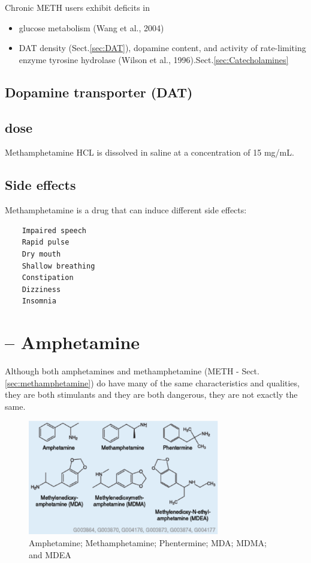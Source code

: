 Chronic METH users exhibit deficits in 
\begin{itemize}
  \item  glucose metabolism (Wang et al., 2004)
  
  \item DAT density (Sect.\ref{sec:DAT}), dopamine content, and activity of
  rate-limiting enzyme tyrosine hydrolase (Wilson et al., 1996).Sect.\ref{sec:Catecholamines}
\end{itemize}

\subsection{Dopamine transporter (DAT)}
\label{sec:dopamine-transporter}
\label{sec:DAT}




\subsection{dose}

Methamphetamine HCL is dissolved in saline at a concentration of 15 mg/mL.

\subsection{Side effects}

Methamphetamine is a drug that can induce different side effects:
\begin{verbatim}
    Impaired speech
    Rapid pulse
    Dry mouth
    Shallow breathing
    Constipation
    Dizziness
    Insomnia
\end{verbatim}

\section{-- Amphetamine}
\label{chap:amphetamine}
\label{sec:amphetamine}

Although both amphetamines and methamphetamine (METH -
Sect.\ref{sec:methamphetamine}) do have many of the same characteristics and
qualities, they are both stimulants and they are both dangerous, they are not
exactly the same.

\begin{figure}[hbt]
  \centerline{\includegraphics[height=5cm,
    angle=0]{./images/amphetamine.eps}}
  \caption{Amphetamine; Methamphetamine; Phentermine; MDA; MDMA; and MDEA}
\label{fig:amphetamine}
\end{figure}

